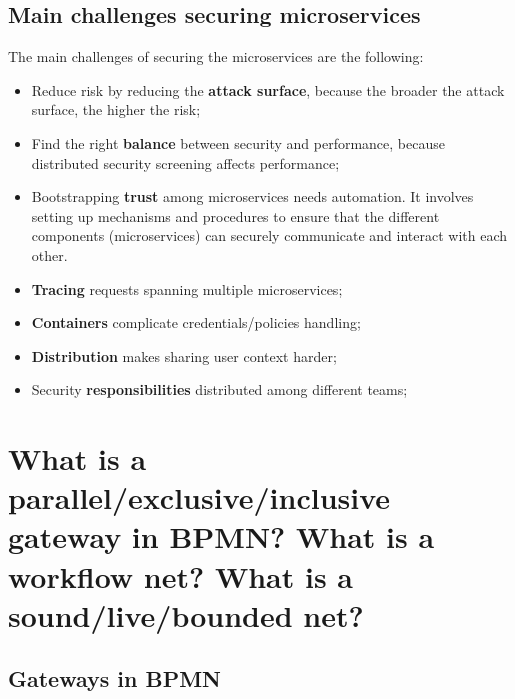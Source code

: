 \subsection{Main challenges securing microservices}
The main challenges of securing the microservices are the following:
\begin{itemize}
   \item Reduce risk by reducing the \textbf{attack surface}, because the broader the attack surface, the higher the risk;
   \item Find the right \textbf{balance} between security and performance, because distributed security screening affects performance;
   \item Bootstrapping \textbf{trust} among microservices needs automation. It involves setting up mechanisms and procedures to ensure that the different components (microservices) can securely communicate and interact with each other.
   \item \textbf{Tracing} requests spanning multiple microservices;
   \item \textbf{Containers} complicate credentials/policies handling;
   \item \textbf{Distribution} makes sharing user context harder;
   \item Security \textbf{responsibilities} distributed among different teams;
\end{itemize}

\section{What is a parallel/exclusive/inclusive gateway in BPMN? What is a workflow net? What is a sound/live/bounded net?}
\subsection{Gateways in BPMN}

